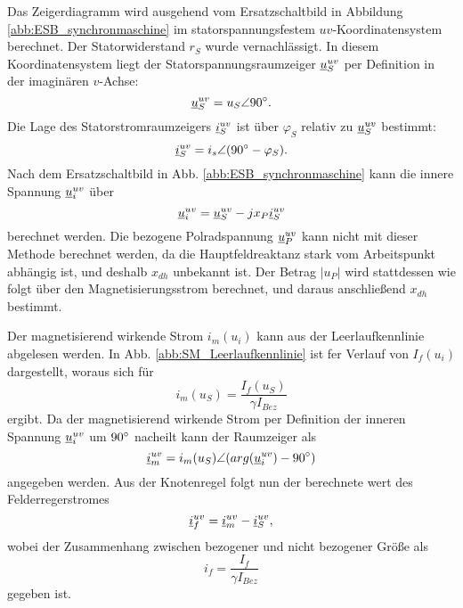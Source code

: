 \noindent Das Zeigerdiagramm wird ausgehend vom Ersatzschaltbild in Abbildung \ref{abb:ESB_synchronmaschine} im statorspannungsfestem $uv$-Koordinatensystem berechnet. Der Statorwiderstand $r_S$ wurde vernachlässigt. In diesem Koordinatensystem liegt der Statorspannungsraumzeiger $\underline{u}^{uv}_S$ per Definition in der imaginären $v$-Achse:
\begin{equation*}
    \underline{u}^{uv}_S = u_S \angle 90\degree.
\end{equation*}
Die Lage des Statorstromraumzeigers $\underline{i}^{uv}_S$ ist über $\varphi_S$ relativ zu $\underline{u}^{uv}_S$ bestimmt:
\begin{equation*}
    \underline{i}^{uv}_S=i_s \angle (90\degree-\varphi_S).
\end{equation*}
Nach dem Ersatzschaltbild in Abb. \ref{abb:ESB_synchronmaschine} kann die innere Spannung $\underline{u}^{uv}_i$ über
\begin{equation*}
    \underline{u}^{uv}_i=\underline{u}^{uv}_S-j x_P \underline{i}^{uv}_S
\end{equation*}
berechnet werden. Die bezogene Polradspannung $\underline{u}^{uv}_P$ kann nicht mit dieser Methode berechnet werden, da die Hauptfeldreaktanz stark vom Arbeitspunkt abhängig ist, und deshalb $x_{dh}$ unbekannt ist. Der Betrag $|u_P|$ wird stattdessen wie folgt über den Magnetisierungsstrom berechnet, und daraus anschließend $x_{dh}$ bestimmt.

\noindent Der magnetisierend wirkende Strom $i_m(u_i)$ kann aus der Leerlaufkennlinie abgelesen werden. In Abb. \ref{abb:SM_Leerlaufkennlinie} ist fer Verlauf von $I_f(u_i)$ dargestellt, woraus sich für
\begin{equation*}
    i_m(u_S)=\frac{I_f(u_S)}{\gamma I_{Bez}}
\end{equation*}
ergibt. Da der magnetisierend wirkende Strom per Definition der inneren Spannung $\underline{u}^{uv}_i$ um $90\degree$ nacheilt kann der Raumzeiger als
\begin{equation*}
    \underline{i}^{uv}_m=i_m(u_S) \angle (arg(\underline{u}^{uv}_i)-90\degree)
\end{equation*}
angegeben werden. Aus der Knotenregel folgt nun der berechnete wert des Felderregerstromes
\begin{equation*}
    \underline{i}^{uv}_f=\underline{i}^{uv}_m-\underline{i}^{uv}_S, 
\end{equation*}
wobei der Zusammenhang zwischen bezogener und nicht bezogener Größe als
\begin{equation*}
    i_f=\frac{I_f}{\gamma I_{Bez}}
\end{equation*}
gegeben ist.

